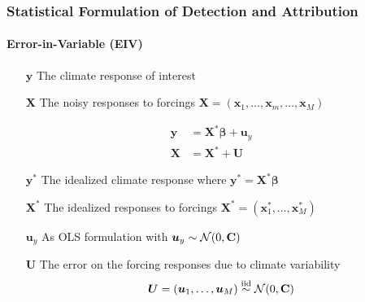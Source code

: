 \documentclass{beamer}
\newcommand{\C}{\ensuremath{\text{Cov}}}
\def\*#1{\bm{#1}}
\def\C{\textbf{\text{C}}}
\begin{document}
\begin{frame}
\frametitle{Statistical Formulation of Detection and Attribution}
\framesubtitle{Error-in-Variable (EIV)}
\begin{itemize}
\item[$\*y$] The climate response of interest 
\item[$\*X$] The \alert{noisy} responses to forcings $\*X = (\*x_1, \dots, \*x_m , \dots, \*x_M)$
\end{itemize}

\pause

\begin{block}{}
\vspace*{-\baselineskip}\setlength\belowdisplayshortskip{0pt}
\begin{align*}
\*y &= \*X^* \*\beta + \*u_y \nonumber \\
\*X &= \*X^* + \*U \:
\end{align*}
\end{block}

\pause

\begin{itemize}
\item[$\*y^*$] The idealized climate response where $\*y^* = \*X^* \*\beta$
\item[$\*X^*$] The idealized responses to forcings $\*X^* = (\*x_1^*, \dots, \*x_M^*)$
\end{itemize}

\begin{itemize}
\item[$\*u_y$] As OLS formulation with $\*u_y \sim \mathcal N(0, \C)$
\item[$\*U$] The error on the forcing responses due to climate variability
\setlength\abovedisplayskip{0pt}
\setlength\belowdisplayskip{0pt}
\[
\*U = (\*u_1, \dots, \*u_M) \stackrel{\text{iid}}{\sim} \mathcal{N}(0,\C)
\]

\end{itemize}

\end{frame}
\end{document}
